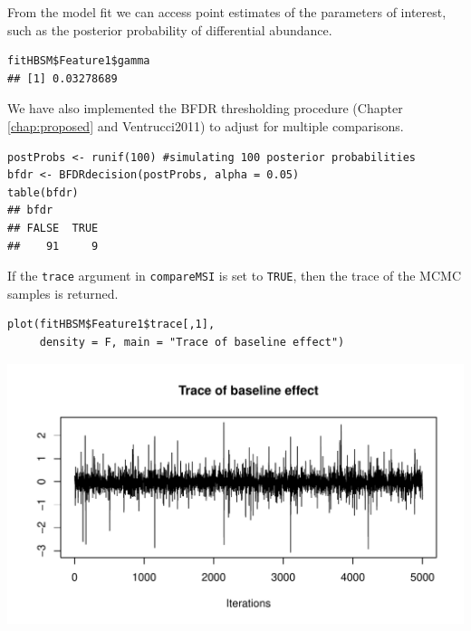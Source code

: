 \documentclass[a4paper]{article}\usepackage[]{graphicx}\usepackage[]{color}
\makeatletter
\def\maxwidth{ %
  \ifdim\Gin@nat@width>\linewidth
    \linewidth
  \else
    \Gin@nat@width
  \fi
}
\newenvironment{kframe}{%
 \def\at@end@of@kframe{}%
 \ifinner\ifhmode%
  \def\at@end@of@kframe{\end{minipage}}%
  \begin{minipage}{\columnwidth}%
 \fi\fi%
 \def\FrameCommand##1{\hskip\@totalleftmargin \hskip-\fboxsep
 \colorbox{shadecolor}{##1}\hskip-\fboxsep
     \hskip-\linewidth \hskip-\@totalleftmargin \hskip\columnwidth}%
 \MakeFramed {\advance\hsize-\width
   \@totalleftmargin\z@ \linewidth\hsize
   \@setminipage}}%
 {\par\unskip\endMakeFramed%
 \at@end@of@kframe}
\newenvironment{knitrout}{}{} %
\makeatother
\begin{document}
From the model fit we can access point estimates of the parameters of interest, such as the posterior probability of differential abundance.
\begin{knitrout}
\color{fgcolor}\begin{kframe}
\begin{verbatim}
fitHBSM$Feature1$gamma
## [1] 0.03278689
\end{verbatim}
\end{kframe}
\end{knitrout}

We have also implemented the BFDR thresholding procedure (Chapter \ref{chap:proposed} and {Ventrucci2011}) to adjust for multiple comparisons.
\begin{knitrout}
\color{fgcolor}\begin{kframe}
\begin{verbatim}
postProbs <- runif(100) #simulating 100 posterior probabilities
bfdr <- BFDRdecision(postProbs, alpha = 0.05)
table(bfdr)
## bfdr
## FALSE  TRUE 
##    91     9
\end{verbatim}
\end{kframe}
\end{knitrout}

If the \texttt{trace} argument in \texttt{compareMSI} is set to \texttt{TRUE}, then the trace of the MCMC samples is returned.

\begin{knitrout}
\color{fgcolor}\begin{kframe}
\begin{verbatim}
plot(fitHBSM$Feature1$trace[,1], 
     density = F, main = "Trace of baseline effect")
\end{verbatim}
\end{kframe}

{\centering \includegraphics[width=\maxwidth]{figure/unnamed-chunk-12-1} 

}



\end{knitrout}
\end{document}
